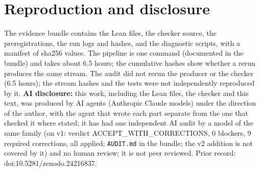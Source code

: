\documentclass[11pt]{article}
\begin{document}
\section*{Reproduction and disclosure}
The evidence bundle contains the Lean files, the checker source, the preregistrations, the run logs and hashes, and the diagnostic scripts, with a manifest of sha256 values. The pipeline is one command
(documented in the bundle) and takes about 6.5 hours; the cumulative hashes show whether a rerun produces the same stream. The audit did not rerun the producer or the checker (6.5 hours); the stream hashes and the tests were not independently reproduced by it. \textbf{AI disclosure:} this work, including the Lean files, the checker and this text,
was produced by AI agents (Anthropic Claude models) under the direction of the author, with the agent that wrote each part separate from the one that checked it where stated; it has had one independent AI audit by a model of the same family
(on v1: verdict ACCEPT\_WITH\_CORRECTIONS, 0 blockers, 9 required corrections, all applied; \texttt{AUDIT.md} in the bundle; the v2 addition is not covered by it) and no human review; it is not peer reviewed. Prior record: doi:10.5281/zenodo.24216837.
\end{document}
